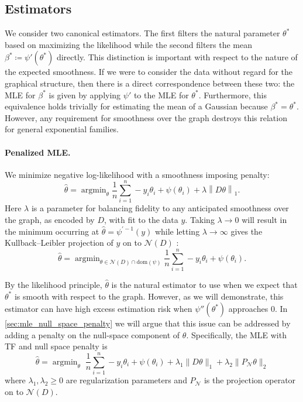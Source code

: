 \documentclass[ejs,noshowframe]{imsart}
\theoremstyle{plain}
\theoremstyle{definition}
\DeclareMathOperator*{\argmin}{argmin}
\newcommand{\norm}[1]{\left\lVert #1 \right\rVert}
\newcommand{\cN}{\mathcal{N}}
\renewcommand{\hat}{\widehat}
\begin{document}
\subsection{Estimators}


We consider two canonical estimators. The first
filters the natural parameter $\theta^*$ based on maximizing the likelihood
while the second filters the mean $\beta^*\coloneqq\psi'(\theta^*)$ directly.
This distinction is important with respect to the nature of the expected
smoothness. If
we were to consider the data without regard for the graphical structure, then
there is a direct correspondence between these two: the MLE for $\beta^*$ is
given by applying $\psi'$ to the MLE for $\theta^*$. Furthermore, this
equivalence holds trivially for estimating the mean of a Gaussian because
$\beta^* = \theta^*$. However, any requirement for smoothness over the graph
destroys this relation for general exponential families.



\paragraph*{Penalized MLE.}
We minimize negative log-likelihood with a smoothness imposing penalty:
\begin{equation}
  \label{eq:mle1}
  \hat\theta = \argmin_\theta \frac{1}{n} \sum_{i=1}^n- y_i\theta_i + 
\psi(\theta_i) + \lambda\norm{D\theta}_1.
\end{equation}
Here $\lambda$ is a parameter for balancing fidelity to any anticipated
smoothness over the graph, as encoded by $D$, with fit to the data $y$. Taking
$\lambda \rightarrow 0$ will result in the minimum occurring at $\hat\theta =
\psi^{\prime -1}(y)$ 
while letting $\lambda\rightarrow\infty$ gives the Kullback--Leibler projection
of $y$ on to $\mathcal{N}(D)$ \citep{bauschke1997legendre}:
\[
\hat\theta = \argmin_{\theta\in\mathcal{N}(D)\cap \textrm{dom}(\psi)} \frac{1}{n} \sum_{i=1}^n- y_i\theta_i + 
\psi(\theta_i).
\]

By the likelihood principle, $\hat\theta$ is the natural estimator to use when 
we expect
that $\theta^*$ is smooth with respect to the graph. However, as we will 
demonstrate,
this estimator can have high excess estimation risk when $\psi''(\theta^*)$
approaches $0$. In \autoref{sec:mle_null_space_penalty} we will argue that this issue 
can be addressed by adding a 
penalty on the null-space component of $\theta$.
Specifically, the MLE with TF and null space penalty is 
\begin{equation}
	\label{eq:estimator}
	\hat\theta = \argmin_{\theta} \; \frac{1}{n}\sum_{i=1}^n
	-y_i \theta_i + \psi(\theta_i) +  \lambda_1 \| D\theta\|_1 +
	\lambda_2 \| P_\cN \theta\|_2
\end{equation}
where $\lambda_1, \lambda_2 \geq 0$ are regularization parameters and $P_\cN$ is
the projection operator on to $\cN(D)$. 
\end{document}
